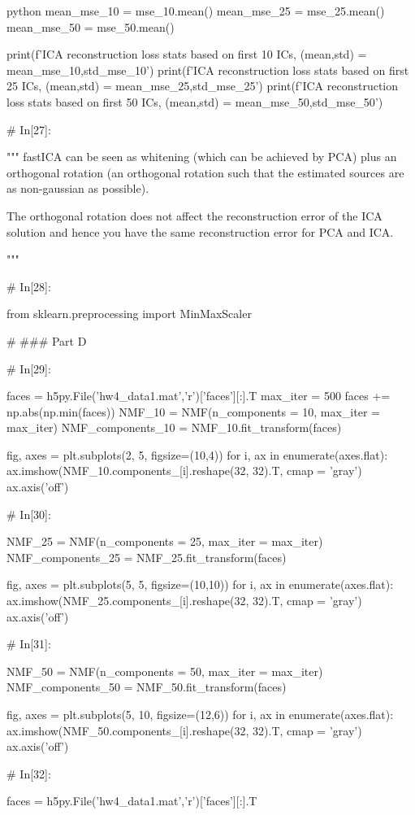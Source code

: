 \documentclass[12pt]{amsart}
\begin{document}
\begin{mintedbox}{python}
mean_mse_10 = mse_10.mean()
mean_mse_25 = mse_25.mean()
mean_mse_50 = mse_50.mean()


print(f'ICA reconstruction loss stats based on first 10 ICs, \n (mean,std) = {mean_mse_10,std_mse_10}')
print(f'ICA reconstruction loss stats based on first 25 ICs, \n (mean,std) = {mean_mse_25,std_mse_25}')
print(f'ICA reconstruction loss stats based on first 50 ICs, \n (mean,std) = {mean_mse_50,std_mse_50}')


# In[27]:


"""
fastICA can be seen as whitening (which can be achieved by PCA) plus an orthogonal rotation (an orthogonal rotation such that the estimated sources are as non-gaussian as possible).

The orthogonal rotation does not affect the reconstruction error of the ICA solution and hence you have the same reconstruction error for PCA and ICA.

"""


# In[28]:


from sklearn.preprocessing import MinMaxScaler


# ### Part D

# In[29]:


faces = h5py.File('hw4_data1.mat','r')['faces'][:].T
max_iter = 500
faces += np.abs(np.min(faces))
NMF_10 = NMF(n_components = 10, max_iter = max_iter)
NMF_components_10 = NMF_10.fit_transform(faces)


fig, axes = plt.subplots(2, 5, figsize=(10,4))
for i, ax in enumerate(axes.flat):
    ax.imshow(NMF_10.components_[i].reshape(32, 32).T, cmap = 'gray')
    ax.axis('off')


# In[30]:


NMF_25 = NMF(n_components = 25, max_iter = max_iter)
NMF_components_25 = NMF_25.fit_transform(faces)


fig, axes = plt.subplots(5, 5, figsize=(10,10))
for i, ax in enumerate(axes.flat):
    ax.imshow(NMF_25.components_[i].reshape(32, 32).T, cmap = 'gray')
    ax.axis('off')


# In[31]:


NMF_50 = NMF(n_components = 50, max_iter = max_iter)
NMF_components_50 = NMF_50.fit_transform(faces)


fig, axes = plt.subplots(5, 10, figsize=(12,6))
for i, ax in enumerate(axes.flat):
    ax.imshow(NMF_50.components_[i].reshape(32, 32).T, cmap = 'gray')
    ax.axis('off')


# In[32]:


faces = h5py.File('hw4_data1.mat','r')['faces'][:].T


\end{mintedbox}
\end{document}
